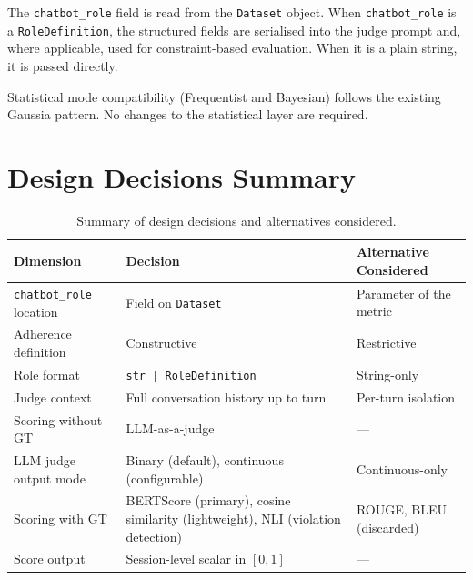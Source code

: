 \documentclass[11pt,a4paper]{article}
\begin{document}
The \texttt{chatbot\_role} field is read from the \texttt{Dataset} object.
When \texttt{chatbot\_role} is a \texttt{RoleDefinition}, the structured
fields are serialised into the judge prompt and, where applicable, used for
constraint-based evaluation. When it is a plain string, it is passed directly.

Statistical mode compatibility (Frequentist and Bayesian) follows the existing
Gaussia pattern. No changes to the statistical layer are required.

\newpage

\section{Design Decisions Summary}

\begin{table}[h]
  \centering
  \caption{Summary of design decisions and alternatives considered.}
  \label{tab:decisions}
  \begin{tabular}{p{4.2cm} p{5.2cm} p{4.5cm}}
    \toprule
    \textbf{Dimension} & \textbf{Decision} & \textbf{Alternative Considered} \\
    \midrule
    \texttt{chatbot\_role} location
      & Field on \texttt{Dataset}
      & Parameter of the metric \\
    \addlinespace
    Adherence definition
      & Constructive
      & Restrictive \\
    \addlinespace
    Role format
      & \texttt{str | RoleDefinition}
      & String-only \\
    \addlinespace
    Judge context
      & Full conversation history up to turn
      & Per-turn isolation \\
    \addlinespace
    Scoring without GT
      & LLM-as-a-judge
      & --- \\
    \addlinespace
    LLM judge output mode
      & Binary (default), continuous (configurable)
      & Continuous-only \\
    \addlinespace
    Scoring with GT
      & BERTScore (primary), cosine similarity (lightweight), NLI (violation detection)
      & ROUGE, BLEU (discarded) \\
    \addlinespace
    Score output
      & Session-level scalar in $[0, 1]$
      & --- \\
    \bottomrule
  \end{tabular}
\end{table}
\end{document}
